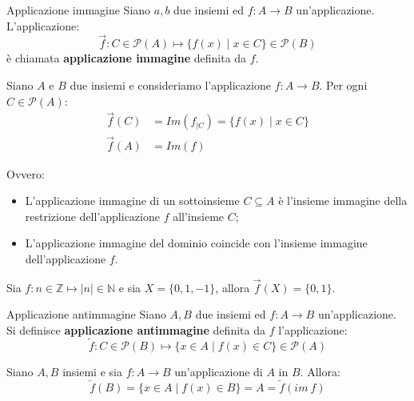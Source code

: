 \begin{defbox}{Applicazione immagine}
	Siano $a,b$ due insiemi ed $f : A \rightarrow B$ un'applicazione. L'applicazione:
	\begin{equation}
		\overrightarrow{f} : C \in \mathcal{P}(A) \mapsto \{f(x) \; | \; x \in C \} \in \mathcal{P}(B)
	\end{equation}
	è chiamata \textbf{applicazione immagine} definita da $f$.
\end{defbox}



\begin{propbox}
	Siano $A$ e $B$ due insiemi e consideriamo l'applicazione $f: A \rightarrow B$. Per ogni $C \in \mathcal{P}(A)$:
	\begin{eqnarray}
		\overrightarrow{f}(C) &= Im (f_{\vert C}) = \{ f(x) \; | \; x \in C \} \\
		\overrightarrow{f}(A) &= Im (f)
	\end{eqnarray}
\end{propbox}

Ovvero:
\begin{itemize}
	\item L'applicazione immagine di un sottoinsieme $C \subseteq A$ è l'insieme immagine della restrizione dell'applicazione $f$ all'insieme $C$;
	\item L'applicazione immagine del dominio coincide con l'insieme immagine dell'applicazione $f$.
\end{itemize}

\begin{example}
	Sia $f: n \in  \mathbb{Z} \mapsto |n| \in \mathbb{N}$ e sia $X= \{ 0,1,-1\}$, allora $\overrightarrow{f}(X)=\{0,1\}$.
\end{example}


\begin{defbox}{Applicazione antimmagine}
	Siano $A,B$ due insiemi ed $f : A \rightarrow B$ un'applicazione. Si definisce \textbf{applicazione antimmagine} definita da $f$ l'applicazione:
	\begin{equation}
		\overleftarrow{f} :C \in \mathcal{P}(B) \mapsto \{ x \in A \; | \; f(x) \in C \} \in \mathcal{P}(A)
	\end{equation}
\end{defbox}

\begin{propbox}
	Siano $A,B$ insiemi e sia $f: A \rightarrow B$ un'applicazione di $A$ in $B$. Allora:
	\begin{equation}
		\overleftarrow{f}(B) = \{x \in A \; | \; f(x) \in B \} = A = \overleftarrow{f}(im \ f)
	\end{equation}
\end{propbox}

